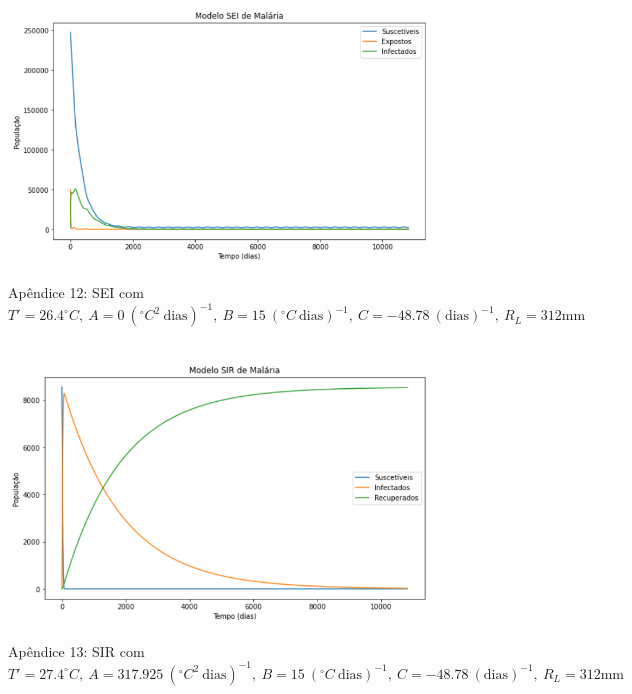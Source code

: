 \documentclass[12pt]{article}
\begin{document}
\begin{figure}[!ht]
        \centering
        \hbox{\hspace{3.5em} \includegraphics[scale=0.6] {SEI_Correcao_max_A0.png}}
        \caption*{Apêndice 12: SEI com $T'=26.4^\circ C, \ A=0 \ (^\circ C^2 \ \text{dias})^{-1}, \ B=15 \ (^\circ C \ \text{dias})^{-1}, \ C=-48.78 \ (\text{dias})^{-1}, \ R_L=312 \text{mm}$}
\end{figure}
\newpage
\begin{figure}[!ht]
        \centering
        \hbox{\hspace{4.0em} \includegraphics[scale=0.6] {SIR_Correcao_max_T_linha.png}}
        \caption*{Apêndice 13: SIR com $T'=27.4^\circ C, \ A=317.925 \ (^\circ C^2 \ \text{dias})^{-1}, \ B=15 \ (^\circ C \ \text{dias})^{-1}, \ C=-48.78 \ (\text{dias})^{-1}, \ R_L=312 \text{mm}$}
\end{figure} 
\end{document}
